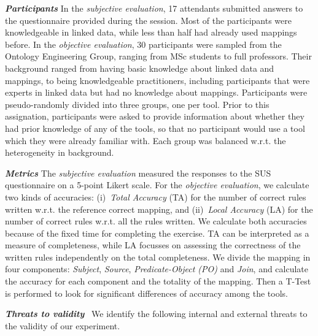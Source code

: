 \noindent\textit{\textbf{Participants}} 
In the \textit{subjective evaluation}, 17 attendants submitted answers to the questionnaire provided during the session. Most of the participants were knowledgeable in linked data, while less than half had already used mappings before. 
In the \textit{objective evaluation}, 30 participants were sampled from the Ontology Engineering Group, ranging from MSc students to full professors. Their background ranged from having basic knowledge about linked data and mappings, to being knowledgeable practitioners, including participants that were experts in linked data but had no knowledge about mappings. Participants were pseudo-randomly divided into three groups, one per tool. Prior to this assignation, participants were asked to provide information about whether they had prior knowledge of any of the tools, so that no participant would use a tool which they were already familiar with. Each group was balanced w.r.t. the heterogeneity in background. 

\noindent\textit{\textbf{Metrics}} 
The \textit{subjective evaluation} measured the responses to the SUS questionnaire on a 5-point Likert scale. 
For the \textit{objective evaluation},
we calculate two kinds of accuracies: (i)~\textit{Total Accuracy} (TA) for the number of correct rules written w.r.t. the reference correct mapping, and (ii)~\textit{Local Accuracy} (LA) for the number of correct rules w.r.t. all the rules written. We calculate both accuracies because of the fixed time for completing the exercise. TA can be interpreted as a measure of completeness, while LA focusses on assessing the correctness of the written rules independently on the total completeness.
We divide the mapping in four components: \textit{Subject}, \textit{Source}, \textit{Predicate-Object (PO)} and \textit{Join}, and calculate the accuracy for each component and the totality of the mapping. Then a T-Test is performed to look for significant differences of accuracy among the tools. 


\noindent\textit{\textbf{Threats to validity}}~\citep{creswell2017research} We identify the following internal and external threats to the validity of our experiment.

